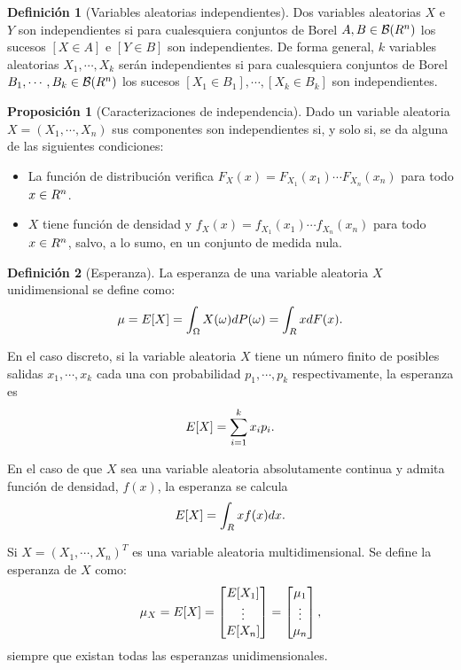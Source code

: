 \documentclass[10pt,a4paper]{article} %
\let\mathbb\relax
\theoremstyle{definition}
\newtheorem{definition}{Definición}[section]
\newtheorem{proposition}[theorem]{Proposición}
\begin{document}
\begin{definition}[Variables aleatorias independientes]
  Dos variables aleatorias $X$ e $Y$ son independientes si para cualesquiera conjuntos de Borel $A, B \in \mathcal{B}(\mathbb{R}^n)$ los sucesos $[X\in A]$ e $[Y\in B]$ son independientes. De forma general, $k$ variables aleatorias $X_1,\cdots,X_k$ serán independientes si para cualesquiera conjuntos de Borel $B_1,\cdots,B_k \in \mathcal{B}(\mathbb{R}^n)$ los sucesos $[X_1 \in B_1],\cdots,[X_k\in B_k]$ son independientes.
\end{definition}

\begin{proposition}[Caracterizaciones de independencia]
  Dado un variable aleatoria $X =(X_1,\cdots,X_n)$ sus componentes son independientes si, y solo si, se da alguna de las siguientes condiciones:
  \begin{itemize}
  \item La función de distribución verifica $F_X(x) = F_{X_1}(x_1)\cdots F_{X_n}(x_n)$ para todo $x \in \mathbb{R}^n$.
  \item $X$ tiene función de densidad y $f_X(x) = f_{X_1}(x_1)\cdots f_{X_n}(x_n)$ para todo $x \in \mathbb{R}^n$, salvo, a lo sumo, en un conjunto de medida nula.
  \end{itemize}
\end{proposition}

\begin{definition}[Esperanza]
  La esperanza de una variable aleatoria $X$ unidimensional se define como:\[
\mu = \mathbb{E}[X] = \int_{\Omega}X(\omega)dP(\omega) = \int_{\mathbb{R}}xdF(x).
\]

En el caso discreto, si la variable aleatoria $X$ tiene un número finito de posibles salidas $x_1,\cdots,x_k$ cada una con probabilidad $p_1,\cdots, p_k$ respectivamente, la esperanza es\[
\mathbb{E}[X] = \sum_{i=1}^kx_ip_i.
\]

En el caso de que $X$ sea una variable aleatoria absolutamente continua y admita función de densidad, $f(x)$, la esperanza se calcula\[
\mathbb{E}[X] = \int_{\mathbb{R}}xf(x)dx.
\]
  
  Si  $X=(X_1,\cdots,X_n)^T$ es una variable aleatoria multidimensional. Se define la esperanza de $X$ como:\[
\mu_X = \mathbb{E}[X] = \begin{bmatrix}
           \mathbb{E}[X_1] \\
          \vdots \\
          \mathbb{E}[X_n]
         \end{bmatrix}
 = \begin{bmatrix}
           \mu_1 \\
          \vdots \\
          \mu_n
 \end{bmatrix},  \]
 siempre que existan todas las esperanzas unidimensionales.
\end{definition}
\end{document}
